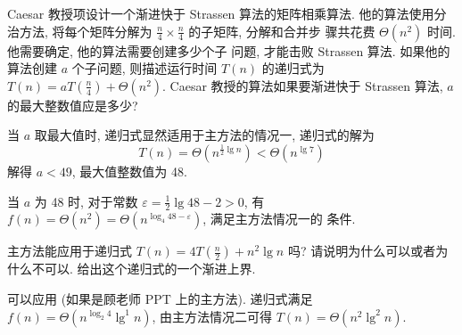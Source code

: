 \documentclass[boxes]{homework}
\begin{document}
\begin{problem}
Caesar 教授项设计一个渐进快于 Strassen 算法的矩阵相乘算法. 他的算法使用分治方法,
将每个矩阵分解为 $\frac{ n }{ 4 } \times \frac{ n }{ 4 }$ 的子矩阵, 分解和合并步
骤共花费 $\Theta \left( n^{2}\right)$ 时间. 他需要确定, 他的算法需要创建多少个子
问题, 才能击败 Strassen 算法. 如果他的算法创建 $a$ 个子问题, 则描述运行时间
$T(n)$ 的递归式为 $T(n) = aT \left( \frac{ n }{ 4 }\right) + \Theta(n^{2})$.
Caesar 教授的算法如果要渐进快于 Strassen 算法, $a$ 的最大整数值应是多少?
\end{problem}
\begin{solution}
    当 $a$ 取最大值时, 递归式显然适用于主方法的情况一, 递归式的解为
    \begin{equation}
        T(n) = \Theta \left( n^{ \frac{ 1 }{ 2 }\lg n} \right) < \Theta
        \left( n^{\lg 7}\right)
    \end{equation}
    解得 $a < 49$, 最大值整数值为 48.

    当 $a$ 为 48 时, 对于常数 $\varepsilon = \frac{ 1 }{ 2 }\lg 48 - 2 > 0$, 有
    $f(n) = \Theta\left( n^{2}\right) =
        \Theta \left( n^{\log_{4} 48 - \varepsilon}\right)$, 满足主方法情况一的
    条件.
\end{solution}

\begin{problem}
主方法能应用于递归式 $T(n) = 4T \left( \frac{ n }{ 2 }\right) + n^{2}\lg n$ 吗?
请说明为什么可以或者为什么不可以. 给出这个递归式的一个渐进上界.
\end{problem}
\begin{solution}
    可以应用 (如果是顾老师 PPT 上的主方法). 递归式满足 $f(n) = \Theta
        \left( n^{\log_{2} 4}\lg^{1} n \right)$, 由主方法情况二可得
    $T(n) = \Theta \left( n^{2}\lg^{2} n\right)$.
\end{solution}

\end{document}
